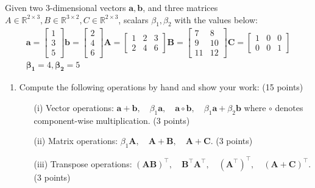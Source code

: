\documentclass[11pt,letterpaper]{article}
\begin{document}
\begin{enumerate}
Given two 3-dimensional vectors $\mathbf{a}, \mathbf{b}$, and three matrices $A \in \mathbb{R}^{2 \times 3}, B \in \mathbb{R}^{3 \times 2}, C \in \mathbb{R}^{2 \times 3}$, scalars $\beta_1, \beta_2$ with the values below:\\

\begin{gather*}
    \mathbf{a} = \begin{bmatrix} 1 \\ 3 \\ 5 \end{bmatrix} 
    \mathbf{b} = \begin{bmatrix} 2 \\ 4 \\ 6 \end{bmatrix} 
    \mathbf{A} = \begin{bmatrix} 1 & 2 & 3 \\ 2 & 4 & 6 \end{bmatrix} 
    \mathbf{B} = \begin{bmatrix} 7 & 8 \\ 9 & 10 \\ 11 & 12 \end{bmatrix} 
    \mathbf{C} = \begin{bmatrix} 1 & 0 & 0 \\ 0 & 0 & 1 \end{bmatrix} \\
    \mathbf{\beta_1} = 4, \mathbf{\beta_2} = 5
\end{gather*}



\begin{enumerate}
\item Compute the following operations by hand and show your work: (15 points)
\begin{enumerate}
    \item [(i)] Vector operations:
    $\mathbf{a} + \mathbf{b}, \quad \beta_1 \mathbf{a}, \quad \mathbf{a} \circ \mathbf{b}, \quad \beta_1 \mathbf{a} + \beta_2 \mathbf{b}$
    where $\circ$ denotes component-wise multiplication. (3 points)
    
    \item [(ii)] Matrix operations: $\beta_1 \mathbf{A}, \quad \mathbf{A} + \mathbf{B}, \quad \mathbf{A} + \mathbf{C}$. (3 points)
    
    \item [(iii)] Transpose operations: $(\mathbf{AB})^\top, \quad \mathbf{B}^\top \mathbf{A}^\top, \quad (\mathbf{A}^{\top})^{\top}, \quad (\mathbf{A} + \mathbf{C})^\top$. (3 points)
    

\end{enumerate}
\end{enumerate}
\end{enumerate}
\end{document}
